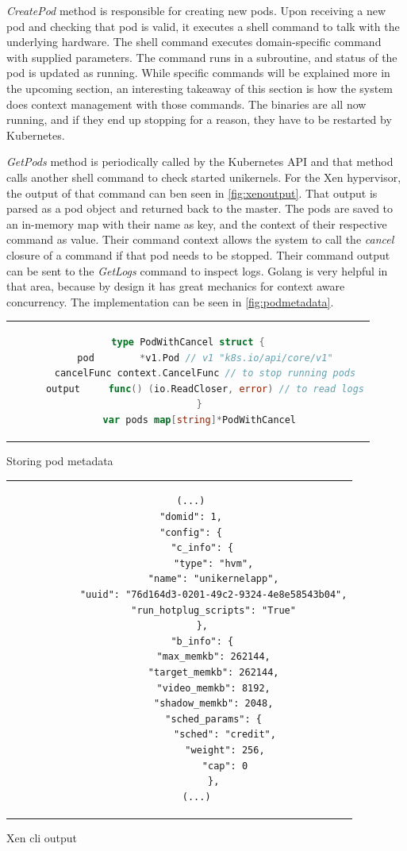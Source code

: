 \textit{CreatePod} method is responsible for creating new pods. Upon receiving a new pod and checking that pod is valid, it executes a shell command to talk with the underlying hardware. The shell command executes domain-specific command with supplied parameters. The command runs in a subroutine, and status of the pod is updated as running. While specific commands will be explained more in the upcoming section, an interesting takeaway of this section is how the system does context management with those commands. The binaries are all now running, and if they end up stopping for a reason, they have to be restarted by Kubernetes.

\textit{GetPods} method is periodically called by the Kubernetes API and that method calls another shell command to check started unikernels. For the Xen hypervisor, the output of that command can ben seen in \ref{fig:xenoutput}. That output is parsed as a pod object and returned back to the master. The pods are saved to an in-memory map with their name as key, and the context of their respective command as value. Their command context allows the system to call the \textit{cancel} closure of a command if that pod needs to be stopped. Their command output can be sent to the \textit{GetLogs} command to inspect logs. Golang is very helpful in that area, because by design it has great mechanics for context aware concurrency. The implementation can be seen in \ref{fig:podmetadata}.
\begin{code}[htpb]
  \centering
  \begin{tabular}{c}
  \begin{lstlisting}[language=go]
    type PodWithCancel struct {
      pod        *v1.Pod // v1 "k8s.io/api/core/v1"
      cancelFunc context.CancelFunc // to stop running pods
      output     func() (io.ReadCloser, error) // to read logs
    }
    var pods map[string]*PodWithCancel
\end{lstlisting}
\end{tabular}
\caption{Storing pod metadata}\label{fig:podmetadata}
\end{code}

\begin{code}[!h]
  \centering
  \begin{tabular}{c}
  \begin{lstlisting}
    (...)
    "domid": 1,
    "config": {
        "c_info": {
            "type": "hvm",
            "name": "unikernelapp",
            "uuid": "76d164d3-0201-49c2-9324-4e8e58543b04",
            "run_hotplug_scripts": "True"
        },
        "b_info": {
            "max_memkb": 262144,
            "target_memkb": 262144,
            "video_memkb": 8192,
            "shadow_memkb": 2048,
            "sched_params": {
                "sched": "credit",
                "weight": 256,
                "cap": 0
            },
      (...)
\end{lstlisting}
\end{tabular}
\caption{Xen cli output}\label{fig:xenoutput}
\end{code}



